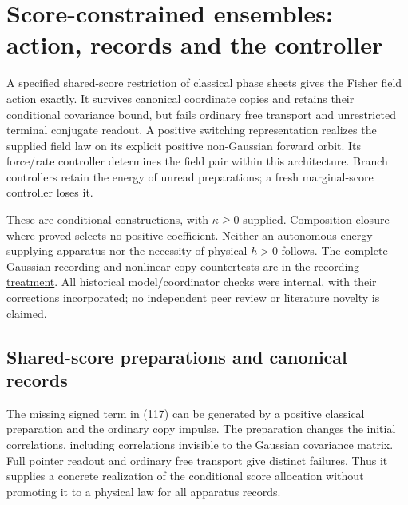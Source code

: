 \documentclass[11pt,a4paper]{article}
\begin{document}
\hypertarget{score-constrained-ensembles-action-records-and-the-controller}{%
\section{Score-constrained ensembles: action, records and the
controller}\label{score-constrained-ensembles-action-records-and-the-controller}}

A specified shared-score restriction of classical phase sheets gives the
Fisher field action exactly. It survives canonical coordinate copies and
retains their conditional covariance bound, but fails ordinary free
transport and unrestricted terminal conjugate readout. A positive
switching representation realizes the supplied field law on its explicit
positive non-Gaussian forward orbit. Its force/rate controller
determines the field pair within this architecture. Branch controllers
retain the energy of unread preparations; a fresh marginal-score
controller loses it.

These are conditional constructions, with \(\kappa\ge0\) supplied.
Composition closure where proved selects no positive coefficient.
Neither an autonomous energy-supplying apparatus nor the necessity of
physical \(\hbar>0\) follows. The complete Gaussian recording and
nonlinear-copy countertests are in
\href{sed-closure-under-recording.md}{the recording treatment}. All
historical model/coordinator checks were internal, with their
corrections incorporated; no independent peer review or literature
novelty is claimed.

\hypertarget{shared-score-preparations-and-canonical-records}{%
\subsection{Shared-score preparations and canonical
records}\label{shared-score-preparations-and-canonical-records}}

The missing signed term in (117) can be generated by a positive
classical preparation and the ordinary copy impulse. The preparation
changes the initial correlations, including correlations invisible to
the Gaussian covariance matrix. Full pointer readout and ordinary free
transport give distinct failures. Thus it supplies a concrete
realization of the conditional score allocation without promoting it to
a physical law for all apparatus records.
\end{document}
